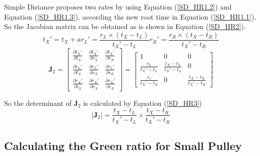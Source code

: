 \documentclass{bmcart}
\begin{document}
\begin{backmatter}
Simple Distance proposes two rates by using Equation (\ref{SD_HR1.2}) and Equation (\ref{SD_HR1.3}), according the new root time in Equation (\ref{SD_HR1.1}). So the Jacobian matrix can be obtained as is shown in Equation (\ref{SD_HR2}).
\begin{subequations}\label{SD_HR1}
\begin{equation}\label{SD_HR1.1}
 {t_X}' = {t_X} + a
\end{equation}
\begin{equation} \label{SD_HR1.2}
{r_L}' = \frac{{{r_L} \times ({t_X} - {t_L})}}{{{t_X}' - {t_L}}}
\end{equation}
\begin{equation}\label{SD_HR1.3}
  {r_R}' = \frac{{{r_R} \times ({t_X} - {t_R})}}{{{t_X}' - {t_R}}}
\end{equation}
\end{subequations}
\begin{equation}\label{SD_HR2}
{{\mathbf{J}}_2} = \left[ {\begin{array}{*{20}{c}}
  {\frac{{\partial {t_X}'}}{{\partial {t_X}}}}&{\frac{{\partial {t_X}'}}{{\partial {r_X}}}}&{\frac{{\partial {t_X}'}}{{\partial {r_R}}}} \\
  {\frac{{\partial {r_L}'}}{{\partial {t_X}}}}&{\frac{{\partial {r_L}'}}{{\partial {r_X}}}}&{\frac{{\partial {r_L}'}}{{\partial {r_R}}}} \\
  {\frac{{\partial {r_X}'}}{{\partial {t_X}}}}&{\frac{{\partial {r_X}'}}{{\partial {r_X}}}}&{\frac{{\partial {r_X}'}}{{\partial {r_R}}}}
\end{array}} \right] = \left[ {\begin{array}{*{20}{c}}
  1&0&0 \\
  {\frac{{{r_L}}}{{{t_X}' - {t_L}}}}&{\frac{{{t_X} - {t_L}}}{{{t_X}' - {t_L}}}}&0 \\
  {\frac{{{r_x}}}{{{t_X}' - {t_R}}}}&0&{\frac{{{t_X} - {t_R}}}{{{t_X}' - {t_R}}}}
\end{array}} \right]
\end{equation}

So the determinant of ${{\mathbf{J}}_2}$ is calculated by Equation (\ref{SD_HR3})
\begin{equation}\label{SD_HR3}
\left| {{{\mathbf{J}}_2}} \right| = \frac{{{t_X} - {t_L}}}{{{t_X}' - {t_L}}} \times \frac{{{t_X} - {t_R}}}{{{t_X}' - {t_R}}}
\end{equation}
\subsection*{Calculating the Green ratio for Small Pulley}


\end{backmatter}
\end{document}
